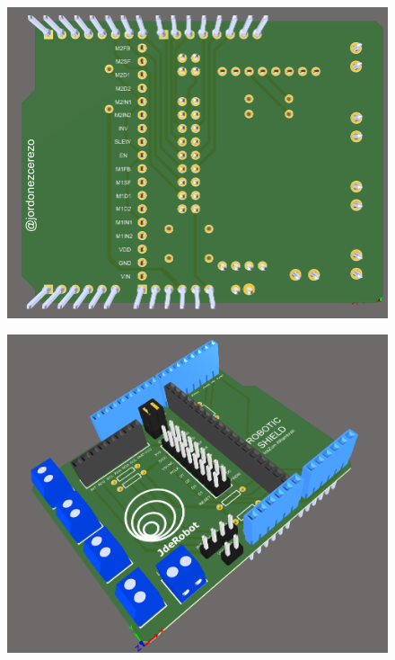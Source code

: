\begin{center}
	\begin{figure}[H]
		\center
		\includegraphics[scale=0.6]{imagenes/Balancing_Robot/bottom_3D.PNG}
		\caption{}
		\label{fig:bottom_3D}
	\end{figure}
\end{center}

\begin{center}
	\begin{figure}[H]
		\center
		\includegraphics[scale=0.8]{imagenes/Balancing_Robot/Vista3D1.PNG}
		\caption{}
		\label{fig:Vista3D1}
	\end{figure}
\end{center}

